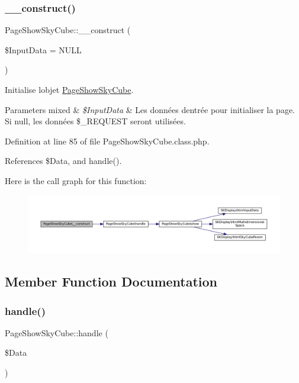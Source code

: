\subsubsection{\texorpdfstring{\+\_\+\+\_\+construct()}{\_\_construct()}}
{\footnotesize\ttfamily Page\+Show\+Sky\+Cube\+::\+\_\+\+\_\+construct (\begin{DoxyParamCaption}\item[{}]{\$\+Input\+Data = {\ttfamily NULL} }\end{DoxyParamCaption})}

Initialise l\textquotesingle{}objet \hyperlink{class_page_show_sky_cube}{Page\+Show\+Sky\+Cube}.


\begin{DoxyParams}[1]{Parameters}
mixed & {\em \$\+Input\+Data} & Les données d\textquotesingle{}entrée pour initialiser la page. Si null, les données \$\+\_\+\+R\+E\+Q\+U\+E\+ST seront utilisées. \\
\hline
\end{DoxyParams}


Definition at line 85 of file Page\+Show\+Sky\+Cube.\+class.\+php.



References \$\+Data, and handle().

Here is the call graph for this function\+:\nopagebreak
\begin{figure}[H]
\begin{center}
\leavevmode
\includegraphics[width=350pt]{class_page_show_sky_cube_a176fc261000e1b893944233c97f1677a_cgraph}
\end{center}
\end{figure}


\subsection{Member Function Documentation}
\mbox{\label{class_page_show_sky_cube_aff86dfb051c5c4bdba1226b3a6f7bfc0}} 
\subsubsection{\texorpdfstring{handle()}{handle()}}
{\footnotesize\ttfamily Page\+Show\+Sky\+Cube\+::handle (\begin{DoxyParamCaption}\item[{}]{\$\+Data }\end{DoxyParamCaption})\hspace{0.3cm}{\ttfamily [protected]}}

